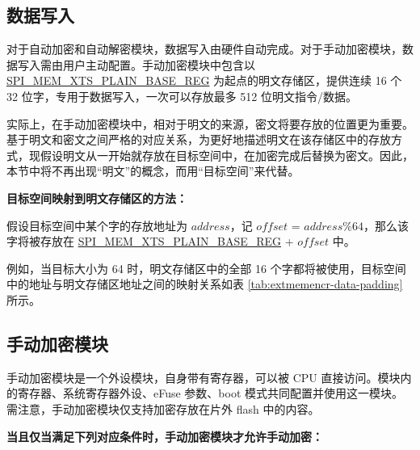 \documentclass[main\_\_CN.tex]{subfiles}
\begin{document}
\subsection{数据写入}
\label{sec:extmemncr-data-writing}

对于自动加密和自动解密模块，数据写入由硬件自动完成。对于手动加密模块，数据写入需由用户主动配置。手动加密模块中包含以 \hyperref[regdesc:SPIMEMXTSPLAINBASEREG]{SPI\_MEM\_XTS\_PLAIN\_BASE\_REG} 为起点的明文存储区，提供连续 16 个 32 位字，专用于数据写入，一次可以存放最多 512 位明文指令/数据。

实际上，在手动加密模块中，相对于明文的来源，密文将要存放的位置更为重要。基于明文和密文之间严格的对应关系，为更好地描述明文在该存储区中的存放方式，现假设明文从一开始就存放在目标空间中，在加密完成后替换为密文。因此，本节中将不再出现“明文”的概念，而用“目标空间”来代替。

{\bfseries 目标空间映射到明文存储区的方法：}

假设目标空间中某个字的存放地址为 \begin{math} address \end{math}，记 \begin{math}offset\end{math} = \begin{math} address \% 64 \end{math}，那么该字将被存放在 \hyperref[regdesc:SPIMEMXTSPLAINBASEREG]{SPI\_MEM\_XTS\_PLAIN\_BASE\_REG} + \begin{math}offset\end{math} 中。

例如，当目标大小为 64 时，明文存储区中的全部 16 个字都将被使用，目标空间中的地址与明文存储区地址之间的映射关系如表 \ref{tab:extmemencr-data-padding} 所示。



\subsection{手动加密模块}

手动加密模块是一个外设模块，自身带有寄存器，可以被 CPU 直接访问。模块内的寄存器、系统寄存器外设、eFuse 参数、boot 模式共同配置并使用这一模块。需注意，手动加密模块仅支持加密存放在片外 flash 中的内容。

\textbf{当且仅当满足下列对应条件时，手动加密模块才允许手动加密：}
\end{document}
